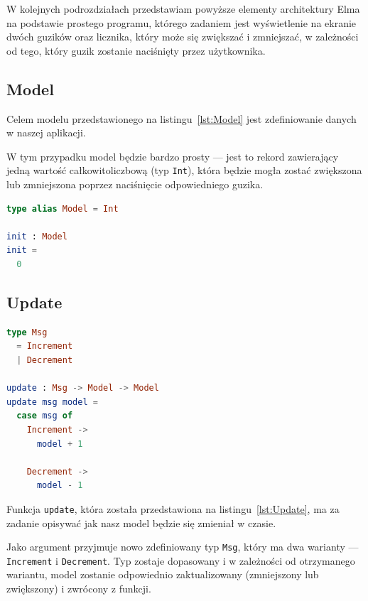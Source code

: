 \documentclass[twoside,a4paper]{report}
\begin{document}
W kolejnych podrozdziałach przedstawiam powyższe elementy architektury Elma na podstawie prostego programu, którego zadaniem jest wyświetlenie na ekranie dwóch guzików oraz licznika, który może się zwiększać i zmniejszać, w zależności od tego, który guzik zostanie naciśnięty przez użytkownika.

\subsection{Model}
\begin{minipage}{.50\textwidth}
    Celem modelu przedstawionego na listingu~\ref{lst:Model} jest zdefiniowanie danych w naszej aplikacji.

    W tym przypadku model będzie bardzo prosty --- jest to rekord zawierający jedną wartość całkowitoliczbową (typ \texttt{Int}), która będzie mogła zostać zwiększona lub zmniejszona poprzez naciśnięcie odpowiedniego guzika.
\end{minipage}\hfill
\begin{minipage}{.43\textwidth}
\begin{lstlisting}[caption={\textit{The Elm Architecture} --- Model},label={lst:Model},language={Elm}]
type alias Model = Int

init : Model
init =
  0
    \end{lstlisting}
\end{minipage}\hfill

\subsection{Update}
\begin{minipage}{.43\textwidth}
    \begin{lstlisting}[caption={\textit{The Elm Architecture} --- Update},label={lst:Update},language={Elm}]
type Msg
  = Increment
  | Decrement

update : Msg -> Model -> Model
update msg model =
  case msg of
    Increment ->
      model + 1

    Decrement ->
      model - 1
    \end{lstlisting}
\end{minipage}\hfill
\begin{minipage}{.50\textwidth}
    Funkcja \texttt{update}, która została przedstawiona na listingu~\ref{lst:Update}, ma za zadanie opisywać jak nasz model będzie się zmieniał w czasie.

    Jako argument przyjmuje nowo zdefiniowany typ \texttt{Msg}, który ma dwa warianty --- \texttt{Increment} i \texttt{Decrement}.
    Typ zostaje dopasowany i w zależności od otrzymanego wariantu, model zostanie odpowiednio zaktualizowany (zmniejszony lub zwiększony) i zwrócony z funkcji.
\end{minipage}\hfill
\end{document}
